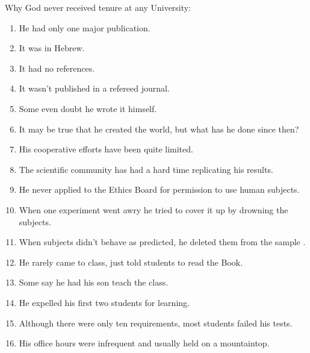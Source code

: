 Why God never received tenure at any University:
\begin{enumerate}
	\item He had only one major publication.

	\item It was in Hebrew. 

	\item It had no references. 

	\item It wasn't published in a refereed journal.

	\item Some even doubt he wrote it himself. 

	\item It may be true that he created the world, but what has he done since then? 

	\item His cooperative efforts have been quite limited. 

	\item The scientific community has had a hard time replicating his results. 

	\item He never applied to the Ethics Board for permission to use human subjects.

	\item When one experiment went awry he tried to cover it up by drowning the subjects. 

	\item When subjects didn't behave as predicted, he deleted them from the sample . 

	\item He rarely came to class, just told students to read the Book. 

	\item Some say he had his son teach the class. 

	\item He expelled his first two students for learning. 

	\item Although there were only ten requirements, most students failed his tests. 

	\item His office hours were infrequent and usually held on a mountaintop.
\end{enumerate}

\begin{center}\underline{\hspace{5 cm}}\end{center}

